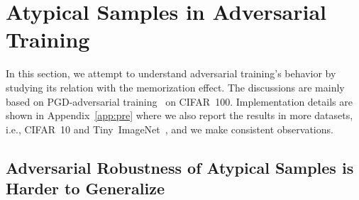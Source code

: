 \vspace{-0.4cm}
\section{Atypical Samples in Adversarial Training}\label{sec:pre}
\vspace{-0.2cm}
In this section, we attempt to understand adversarial training's behavior by studying its relation with the memorization effect. The discussions are mainly based on PGD-adversarial training~\cite{madry2017towards} on CIFAR~100. Implementation details are shown in Appendix~\ref{app:pre} where we also report the results in more datasets, i.e., CIFAR~10 and Tiny~ImageNet~\cite{le2015tiny}, and we make consistent observations.

\vspace{-0.2cm}
\subsection{Adversarial Robustness of Atypical Samples is Harder to Generalize}\label{sec:pre1}

